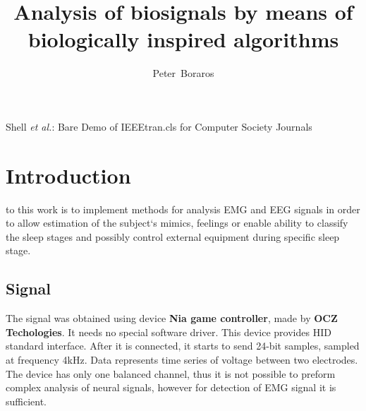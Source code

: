 \documentclass[a4paper,journal]{IEEEtran}
\begin{document}
\title{Analysis of biosignals by means of\\ biologically inspired algorithms}

\author{Peter~Boraros%
}



%
{Shell \MakeLowercase{\textit{et al.}}: Bare Demo of IEEEtran.cls for Computer Society Journals}


\maketitle
\IEEEdisplaynotcompsoctitleabstractindextext
\IEEEpeerreviewmaketitle


\section{Introduction}
 to this work is to implement methods for analysis 
EMG and EEG signals in order to allow estimation of the subject`s mimics, 
feelings or enable ability to classify the sleep stages and possibly control 
external equipment during specific sleep stage.

\subsection{Signal}
The signal was obtained using device 
\textbf{Nia game controller}, made by 
\textbf{OCZ Techologies}.
It needs no special software driver.
This device provides HID standard interface.
After it is connected, it starts to send 24-bit samples, 
sampled at frequency 4kHz. 
Data represents time series of voltage between two electrodes.
The device has only one balanced channel, thus 
it is not possible to preform complex analysis of neural signals,
however for detection of EMG signal it is sufficient.
\end{document}
